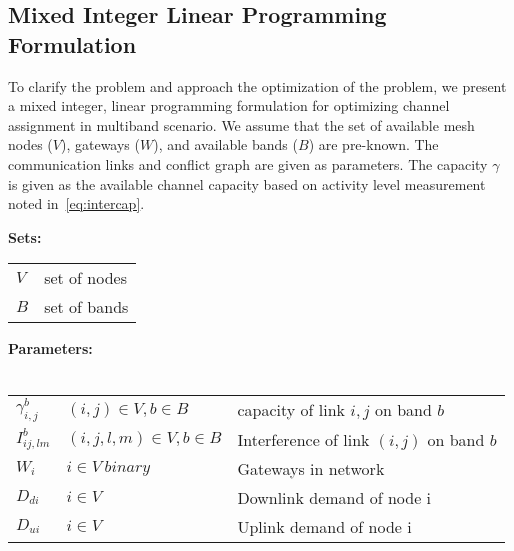 \subsection{Mixed Integer Linear Programming Formulation}
\label{subsec:linearopt}

To clarify the problem and approach the optimization of the 
problem, we present a mixed integer, linear programming 
formulation for optimizing channel assignment in multiband
scenario. We assume that the set of available mesh nodes 
($V$), gateways ($W$), and available bands ($B$) are pre-known. 
The communication links and conflict graph are given as parameters.
The capacity $\gamma$ is given as the available channel capacity
based on activity level measurement noted in~\ref{eq:intercap}. 

\noindent
{\bf Sets:}
\begin{tabular}{ll}
$V$ & set of nodes \\
$B$ & set of bands \\
\end{tabular}

\noindent
{\bf Parameters:}\\
\\
\begin{tabular}{llp{3.4cm}}
$\gamma_{i,j}^b$ & $(i,j)\in V, b \in B$ & capacity of link $i,j$ on band $b$\\
$I_{ij,lm}^b$ & $(i,j,l,m) \in V, b\in B $ & Interference of link $(i,j)$ on band $b$\\
$W_i$ & $i \in V\ binary$ & Gateways in network\\
$D_{di}$ & $i \in V\ $ & Downlink demand of node i\\
$D_{ui}$ & $i \in V\ $ & Uplink demand of node i\\
\end{tabular}


